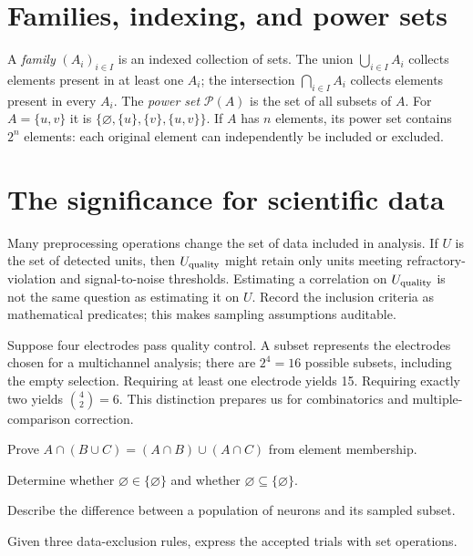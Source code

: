 \section{Families, indexing, and power sets}
A \emph{family} $(A_i)_{i\in I}$ is an indexed collection of sets. The union $\bigcup_{i\in I}A_i$ collects elements present in at least one $A_i$; the intersection $\bigcap_{i\in I}A_i$ collects elements present in every $A_i$. The \emph{power set} $\mathcal P(A)$ is the set of all subsets of $A$. For $A=\{u,v\}$ it is $\{\varnothing,\{u\},\{v\},\{u,v\}\}$. If $A$ has $n$ elements, its power set contains $2^n$ elements: each original element can independently be included or excluded.

\section{The significance for scientific data}
Many preprocessing operations change the set of data included in analysis. If $U$ is the set of detected units, then $U_{\rm quality}$ might retain only units meeting refractory-violation and signal-to-noise thresholds. Estimating a correlation on $U_{\rm quality}$ is not the same question as estimating it on $U$. Record the inclusion criteria as mathematical predicates; this makes sampling assumptions auditable.

\begin{workedexample}
Suppose four electrodes pass quality control. A subset represents the electrodes chosen for a multichannel analysis; there are $2^4=16$ possible subsets, including the empty selection. Requiring at least one electrode yields 15. Requiring exactly two yields $\binom42=6$. This distinction prepares us for combinatorics and multiple-comparison correction.
\end{workedexample}
\begin{exercises}
\item Prove $A\cap(B\cup C)=(A\cap B)\cup(A\cap C)$ from element membership.
\item Determine whether $\varnothing\in\{\varnothing\}$ and whether $\varnothing\subseteq\{\varnothing\}$.
\item Describe the difference between a population of neurons and its sampled subset.
\item Given three data-exclusion rules, express the accepted trials with set operations.
\end{exercises}
